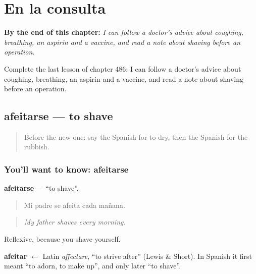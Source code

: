 
\chapter{En la consulta}
\label{ch:es-en-la-consulta}

\begin{chapteropening}
\textbf{By the end of this chapter:} \emph{I can follow a doctor's advice about coughing, breathing, an aspirin and a vaccine, and read a note about shaving before an operation.}

Complete the last lesson of chapter 486: I can follow a doctor's advice about coughing, breathing, an aspirin and a vaccine, and read a note about shaving before an operation.
\end{chapteropening}

\section[afeitarse]{afeitarse — to shave}

\label{lesson:ES-C486-afeitarse}



\begin{quote}
Before the new one: say the Spanish for to dry, then the Spanish for the rubbish.
\end{quote}

\subsection*{You'll want to know: afeitarse}
\textbf{afeitarse} — \textquotedblleft{}to shave\textquotedblright{}.

\begin{quote}
Mi padre se afeita cada mañana.
\end{quote}

\begin{quote}
\emph{My father shaves every morning.}
\end{quote}

Reflexive, because you shave yourself.

\begin{cousinweb}
\textbf{afeitar} $\leftarrow$ Latin \emph{affectare}, \textquotedblleft{}to strive after\textquotedblright{} (Lewis \& Short). In Spanish it first meant \textquotedblleft{}to adorn, to make up\textquotedblright{}, and only later \textquotedblleft{}to shave\textquotedblright{}.
\end{cousinweb}

